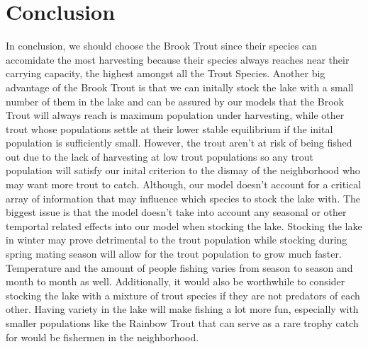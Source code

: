 \documentclass[letterpaper,12pt]{article}
\begin{document}
\section{Conclusion}
In conclusion, we should choose the Brook Trout since their species can accomidate the most harvesting because their species always reaches near their carrying capacity, the highest amongst all the Trout Species.
Another big advantage of the Brook Trout is that we can initally stock the lake with a small number of them in the lake and can be assured by our models that the Brook Trout will always reach is maximum population under harvesting, while other trout whose populations settle at their lower stable equilibrium if the inital population is sufficiently small.
However, the trout aren't at risk of being fished out due to the lack of harvesting at low trout populations so any trout population will satisfy our inital criterion to the dismay of the neighborhood who may want more trout to catch.
Although, our model doesn't account for a critical array of information that may influence which species to stock the lake with. 
The biggest issue is that the model doesn't take into account any seasonal or other temportal related effects into our model when stocking the lake.
Stocking the lake in winter may prove detrimental to the trout population while stocking during spring mating season will allow for the trout population to grow much faster.
Temperature and the amount of people fishing varies from season to season and month to month as well.
Additionally, it would also be worthwhile to consider stocking the lake with a mixture of trout species if they are not predators of each other.
Having variety in the lake will make fishing a lot more fun, especially with smaller populations like the Rainbow Trout that can serve as a rare trophy catch for would be fishermen in the neighborhood.
\pagebreak
\end{document}
